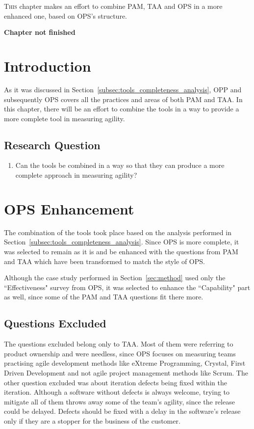 \lettrine[lines=2, loversize=-0.1, lraise=0.1]{T}{his} chapter makes an effort to combine \ac{PAM}, \ac{TAA} and \ac{OPS} in a more enhanced one, based on \ac{OPS}'s structure. 

\bigskip

\textbf{Chapter not finished}

\section{Introduction}
As it was discussed in Section~\ref{subsec:tools_completeness_analysis}, \ac{OPP} and subsequently \ac{OPS} covers all the practices and areas of both \ac{PAM} and \ac{TAA}. In this chapter, there will be an effort to combine the tools in a way to provide a more complete tool in measuring agility.

\subsection{Research Question}
\begin{enumerate}
	\setcounter{enumi}{\thetmpc} %
	\item Can the tools be combined in a way so that they can produce a more complete approach in measuring agility?
\end{enumerate}

\section{\ac{OPS} Enhancement}
The combination of the tools took place based on the analysis performed in Section~\ref{subsec:tools_completeness_analysis}. Since \ac{OPS} is more complete, it was selected to remain as it is and be enhanced with the questions from \ac{PAM} and \ac{TAA} which have been transformed to match the style of \ac{OPS}.

Although the case study performed in Section~\ref{sec:method} used only the ``Effectiveness" survey from \ac{OPS}, it was selected to enhance the ``Capability" part as well, since some of the \ac{PAM} and \ac{TAA} questions fit there more.

\subsection{Questions Excluded}
The questions excluded belong only to \ac{TAA}. Most of them were referring to product ownership and were needless, since \ac{OPS} focuses on measuring teams practising agile development methods like eXtreme Programming, Crystal, First Driven Development and not agile project management methods like Scrum. The other question excluded was about iteration defects being fixed within the iteration. Although a software without defects is always welcome, trying to mitigate all of them throws away some of the team's agility, since the release could be delayed. Defects should be fixed with a delay in the software's release only if they are a stopper for the business of the customer.


